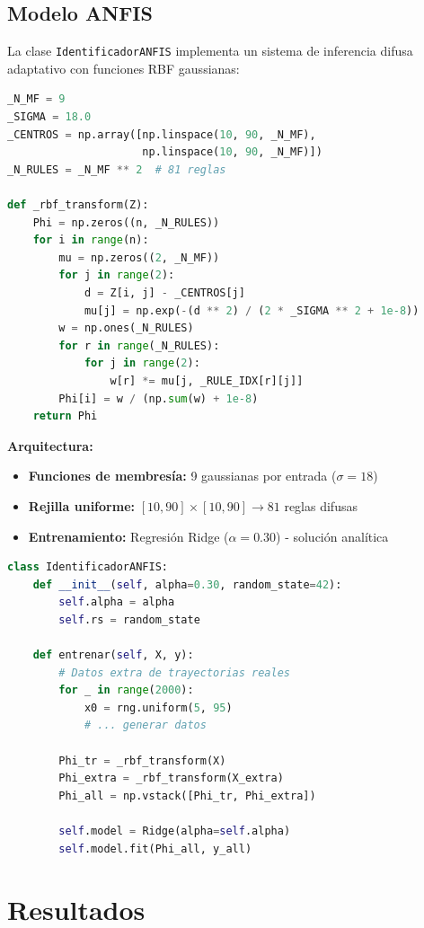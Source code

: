 \documentclass[10pt,twocolumn]{article}
\begin{document}
\subsection{Modelo ANFIS}

La clase \texttt{IdentificadorANFIS} implementa un sistema de inferencia difusa adaptativo con funciones RBF gaussianas:

\begin{lstlisting}[language=Python]
_N_MF = 9
_SIGMA = 18.0
_CENTROS = np.array([np.linspace(10, 90, _N_MF), 
                     np.linspace(10, 90, _N_MF)])
_N_RULES = _N_MF ** 2  # 81 reglas

def _rbf_transform(Z):
    Phi = np.zeros((n, _N_RULES))
    for i in range(n):
        mu = np.zeros((2, _N_MF))
        for j in range(2):
            d = Z[i, j] - _CENTROS[j]
            mu[j] = np.exp(-(d ** 2) / (2 * _SIGMA ** 2 + 1e-8))
        w = np.ones(_N_RULES)
        for r in range(_N_RULES):
            for j in range(2):
                w[r] *= mu[j, _RULE_IDX[r][j]]
        Phi[i] = w / (np.sum(w) + 1e-8)
    return Phi
\end{lstlisting}

\textbf{Arquitectura:}
\begin{itemize}
    \item \textbf{Funciones de membresía:} 9 gaussianas por entrada ($\sigma = 18$)
    \item \textbf{Rejilla uniforme:} $[10,90] \times [10,90] \to 81$ reglas difusas
    \item \textbf{Entrenamiento:} Regresión Ridge ($\alpha = 0.30$) - solución analítica
\end{itemize}

\begin{lstlisting}[language=Python]
class IdentificadorANFIS:
    def __init__(self, alpha=0.30, random_state=42):
        self.alpha = alpha
        self.rs = random_state

    def entrenar(self, X, y):
        # Datos extra de trayectorias reales
        for _ in range(2000):
            x0 = rng.uniform(5, 95)
            # ... generar datos
        
        Phi_tr = _rbf_transform(X)
        Phi_extra = _rbf_transform(X_extra)
        Phi_all = np.vstack([Phi_tr, Phi_extra])
        
        self.model = Ridge(alpha=self.alpha)
        self.model.fit(Phi_all, y_all)
\end{lstlisting}

\section{Resultados}
\end{document}
